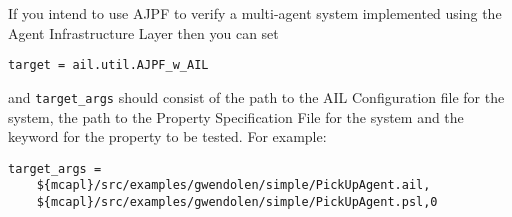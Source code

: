 If you intend to use AJPF to verify a multi-agent system implemented using the Agent Infrastructure Layer then you can set

\texttt{target = ail.util.AJPF\_w\_AIL}

and \texttt{target\_args} should consist of the path to the AIL Configuration file for the system, the path to the Property Specification File for the system and the keyword for the property to be tested.  For example: 

\begin{lstlisting}
target_args = 
    ${mcapl}/src/examples/gwendolen/simple/PickUpAgent.ail, 
    ${mcapl}/src/examples/gwendolen/simple/PickUpAgent.psl,0
\end{lstlisting}
